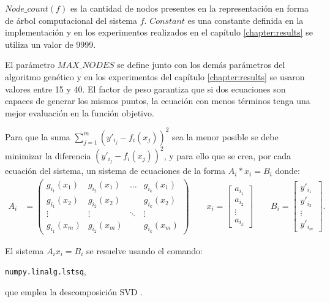 $Node\_count(f)$ es la cantidad de nodos presentes en la representación en forma de árbol computacional del sistema $f$. $Constant$ es una constante definida en la implementación y en los experimentos realizados en el capítulo \ref{chapter:results} se utiliza un valor de 9999.

El parámetro $MAX\_NODES$ se define junto con los demás parámetros del algoritmo genético y en los experimentos del capítulo \ref{chapter:results} se usaron valores entre 15 y 40. El factor de peso garantiza que si dos ecuaciones son capaces de generar los mismos puntos, la ecuación con menos términos tenga una mejor evaluación en la función objetivo.

Para que la suma $\sum_{j=1}^{m}(y'_{i_j} - f_i(x_j)) ^ 2$ sea la menor posible se debe minimizar la diferencia $(y'_{i_j} - f_i(x_j))^2$, y para ello que se crea, por cada ecuación del sistema, un sistema de ecuaciones de la forma $A_i * x_i = B_i$ donde:
\begin{align*}
    A_i & = \begin{pmatrix}
        g_{i_1}(x_1) & g_{i_2}(x_1) & \dots  & g_{i_k}(x_1) \\
        g_{i_1}(x_2) & g_{i_2}(x_2) &        & g_{i_k}(x_2) \\
        \vdots       & \vdots       & \ddots & \vdots       \\
        g_{i_1}(x_m) & g_{i_2}(x_m) &        & g_{i_k}(x_m)
    \end{pmatrix}
    \qquad
    x_i = \begin{bmatrix}
        a_{i_1} \\
        a_{i_2} \\
        \vdots  \\
        a_{i_k}
    \end{bmatrix}
    \qquad
    B_i = \begin{bmatrix}
        y'_{i_1} \\
        y'_{i_2} \\
        \vdots   \\
        y'_{i_m}
    \end{bmatrix}.
\end{align*}

El sistema $A_ix_i = B_i$ se resuelve usando el comando:

\texttt{numpy.linalg.lstsq},

que emplea la descomposición SVD \cite{numpy-lstsq}.

